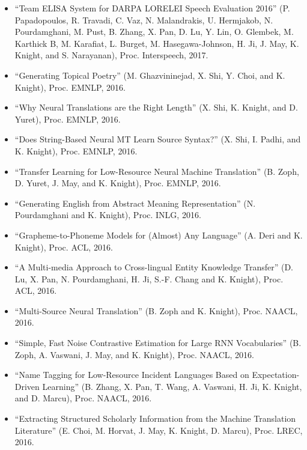 \begin{itemize}
\item ``Team ELISA System for DARPA LORELEI Speech Evaluation 2016'' (P. Papadopoulos, R. Travadi, C. Vaz, N. Malandrakis, U. Hermjakob, N. Pourdamghani, M. Pust, B. Zhang, X. Pan, D. Lu, Y. Lin, O. Glembek, M. Karthick B, M. Karafiat, L. Burget, M. Hasegawa-Johnson, H. Ji, J. May, K. Knight, and S. Narayanan), Proc. Interspeech, 2017. 

\item ``Generating Topical Poetry'' (M. Ghazvininejad, X. Shi, Y. Choi, and K. Knight), Proc. EMNLP, 2016. 

\item ``Why Neural Translations are the Right Length'' (X. Shi, K. Knight, and D. Yuret), Proc. EMNLP, 2016. 

\item ``Does String-Based Neural MT Learn Source Syntax?'' (X. Shi, I. Padhi, and K. Knight), Proc. EMNLP, 2016. 

\item ``Transfer Learning for Low-Resource Neural Machine Translation'' (B. Zoph, D. Yuret, J. May, and K. Knight), Proc. EMNLP, 2016. 



\item ``Generating English from Abstract Meaning Representation'' (N. Pourdamghani and K. Knight), Proc. INLG, 2016. 

\item ``Grapheme-to-Phoneme Models for (Almost) Any Language'' (A. Deri and K. Knight), Proc. ACL, 2016. 

\item ``A Multi-media Approach to Cross-lingual Entity Knowledge Transfer'' (D. Lu, X. Pan, N. Pourdamghani, H. Ji, S.-F. Chang and K. Knight), Proc. ACL, 2016. 


\item ``Multi-Source Neural Translation'' (B. Zoph and K. Knight), Proc. NAACL, 2016. 

\item ``Simple, Fast Noise Contrastive Estimation for Large RNN Vocabularies'' (B. Zoph, A. Vaswani, J. May, and K. Knight), Proc. NAACL, 2016. 

\item ``Name Tagging for Low-Resource Incident Languages Based on Expectation-Driven Learning'' (B. Zhang, X. Pan, T. Wang, A. Vaswani, H. Ji, K. Knight, and D. Marcu), Proc. NAACL, 2016. 

\item ``Extracting Structured Scholarly Information from the Machine Translation Literature'' (E. Choi, M. Horvat, J. May, K. Knight, D. Marcu), Proc. LREC, 2016. 


\end{itemize}
